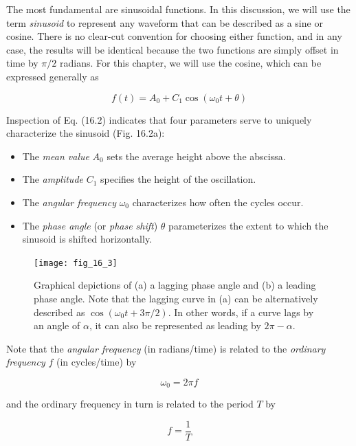 \documentclass[../main.tex]{subfiles}
\begin{document}
The most fundamental are sinusoidal functions. In this discussion, we will use the term \textit{sinusoid} to represent any waveform that can be described as a sine or cosine. There is no clear-cut convention for choosing either function, and in any case, the results will be identical because the two functions are simply offset in time by $\pi/2$ radians. For this chapter, we will use the cosine, which can be expressed generally as

\begin{equation}
	\tag{16.2}
	f(t) = A_0 + C_1 \cos (\omega_0 t + \theta)
\end{equation}

\noindent Inspection of Eq. (16.2) indicates that four parameters serve to uniquely characterize the
sinusoid (Fig. 16.2a):

\begin{itemize}
	\item The \textit{mean value} $A_0$ sets the average height above the abscissa.
	\item The \textit{amplitude} $C_1$ specifies the height of the oscillation.
	\item The \textit{angular frequency} $\omega_0$ characterizes how often the cycles occur.
	\item The \textit{phase angle} (or \textit{phase shift}) $\theta$ parameterizes the extent to which the sinusoid is shifted horizontally.
\end{itemize}

\begin{figure}[H]
	\centering
	\texttt{[image: fig\_16\_3]}
	\caption{\textsf{Graphical depictions of (a) a lagging phase angle and (b) a leading phase angle. Note that the lagging curve in (a) can be alternatively described as $\cos(\omega_0 t + 3 \pi /2)$. In other words, if a curve lags by an angle of $\alpha$, it can also be represented as leading by $2\pi - \alpha$.}}
	\label{fig:fig_16_3}
\end{figure}

Note that the \textit{angular frequency} (in radians/time) is related to the \textit{ordinary frequency} $f$ (in cycles/time) by 

\begin{equation}
	\tag{16.3}
	\omega_0 = 2 \pi f
\end{equation}

\noindent and the ordinary frequency in turn is related to the period $T$ by

\begin{equation}
	\tag{16.4}
	f = \frac{1}{T}
\end{equation}
\end{document}
